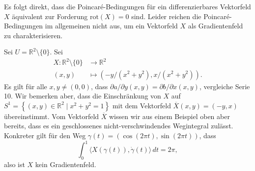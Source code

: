\documentclass[../main.tex]{subfiles}
\begin{document}
Es folgt direkt, dass die Poincaré-Bedingungen für
ein differenzierbares Vektorfeld $X$ äquivalent
zur Forderung $\text{rot}(X) = 0$ sind.
Leider reichen die Poincaré-Bedingungen im allgemeinen
nicht aus, um ein Vektorfeld $X$ als Gradientenfeld
zu charakterisieren.

\begin{example}
  Sei $U = \mathbb{R}^2 \setminus \{0\}$.
  Sei  
  \begin{align*}
    X \colon \mathbb{R}^2 \setminus \{0\} & \to \mathbb{R}^2 \\
    (x, y) & \mapsto (-y/(x^2 + y^2), x/(x^2 + y^2)).
  \end{align*}
  Es gilt für alle $x, y \neq (0, 0)$, dass
  $\partial a / \partial y (x, y) = \partial b/ \partial x(x, y)$,
  vergleiche Serie 10.
  Wir bemerken aber, dass die Einschränkung von $X$ 
  auf $S^1 = \left\{(x, y) \in \mathbb{R}^2 \mid x^2 + y^2 = 1\right\}$ 
  mit dem Vektorfeld $\overline X(x, y) = (-y, x)$ übereinstimmt.
  Vom Vektorfeld $\overline X$ wissen wir aus einem Beispiel
  oben aber bereits, dass es ein geschlossenes nicht-verschwindendes
  Wegintegral zulässt.
  Konkreter gilt für den Weg
  $\gamma(t) = (\cos(2 \pi t), \sin (2 \pi t))$, dass
  \[
    \int_{0}^{1} \langle X(\gamma(t)), \dot \gamma(t) \rangle \, dt
    = 2\pi,
  \]
  also ist $X$ kein Gradientenfeld.
  
\end{example}
\end{document}
